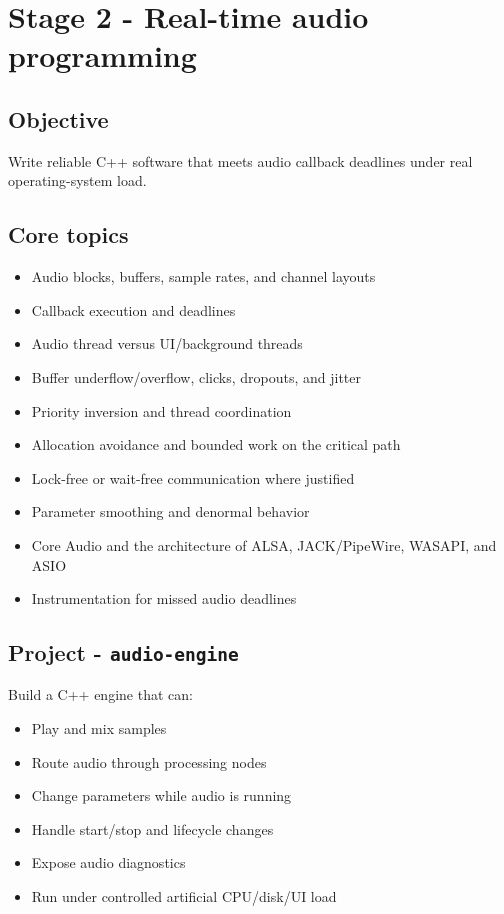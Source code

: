 \documentclass[11pt,letterpaper]{article}
\begin{document}
\clearpage

\section{Stage 2 - Real-time audio programming}\label{stage-2-real-time-audio-programming}

\subsection*{Objective}\label{objective-2}

Write reliable C++ software that meets audio callback deadlines under real operating-system load.

\subsection*{Core topics}\label{core-topics-1}

\begin{itemize}
\item Audio blocks, buffers, sample rates, and channel layouts
\item Callback execution and deadlines
\item Audio thread versus UI/background threads
\item Buffer underflow/overflow, clicks, dropouts, and jitter
\item Priority inversion and thread coordination
\item Allocation avoidance and bounded work on the critical path
\item Lock-free or wait-free communication where justified
\item Parameter smoothing and denormal behavior
\item Core Audio and the architecture of ALSA, JACK/PipeWire, WASAPI, and ASIO
\item Instrumentation for missed audio deadlines
\end{itemize}

\subsection*{Project - \texttt{audio-engine}}\label{project-audio-engine}

Build a C++ engine that can:

\begin{itemize}
\item Play and mix samples
\item Route audio through processing nodes
\item Change parameters while audio is running
\item Handle start/stop and lifecycle changes
\item Expose audio diagnostics
\item Run under controlled artificial CPU/disk/UI load
\end{itemize}
\end{document}
